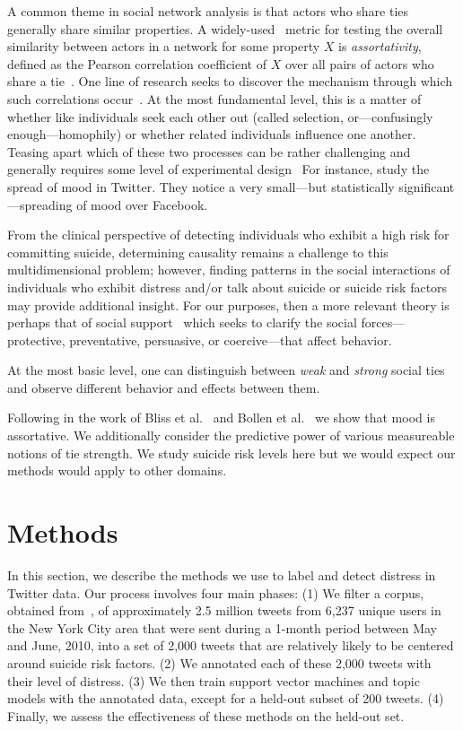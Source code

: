 \documentclass[11pt]{article}
\begin{document}
A common theme in social network analysis is that actors who share ties generally share similar properties. A widely-used~\cite{bliss2012twitter,coviello2014,bollen2011happiness} metric for testing the overall similarity between 
actors in a network for some property $X$ is \emph{assortativity}, defined as  the Pearson correlation coefficient of $X$ over all pairs of actors who share a tie~\cite{newman2002assortative}.  One line of research seeks
to discover the mechanism through which such correlations occur~\cite{newman2002assortative}. 
At the most fundamental level, this is a matter of whether like individuals seek each other out (called selection, or---confusingly enough---homophily) or whether related individuals influence one another. Teasing apart which of these two processes can be rather challenging and generally requires some level of experimental design~\cite{centola2010spread,centola2011experimental}
For instance,  study the spread of mood in Twitter. They notice a very small---but statistically significant---spreading of mood over Facebook. 

From the clinical perspective of detecting individuals who exhibit a high risk for committing suicide, determining  causality remains a challenge to this multidimensional problem; however, finding patterns in the social interactions of individuals who exhibit distress and/or talk about suicide or suicide risk factors may provide additional insight. For our purposes, then a more relevant theory is perhaps that of social support~\cite{wellman1990different} which seeks to clarify the social forces---protective, preventative, persuasive, or coercive---that affect behavior. 

At the most basic level, one can distinguish between \emph{weak} and \emph{strong} social ties and observe different behavior and effects between them.  

Following in the work of Bliss et al.~\cite{coviello2014} and Bollen et al.~\cite{bollen2011happiness} we show that 
mood is assortative. We additionally consider the predictive power of various measureable notions of tie strength.
We study suicide risk levels here but we would expect our methods would apply to other domains.



\section{Methods}
In this section, we describe the methods we use to label and detect distress in Twitter data. Our process involves four main phases: (1) We filter a corpus, obtained from~, of approximately 2.5 million tweets from 6,237 unique users in the New York City area that were sent during a 1-month period between May and June, 2010, into a set of 2,000 tweets that are relatively likely to be centered around suicide risk factors. (2) We annotated each of these 2,000 tweets with their level of distress. (3) We then train support vector machines and topic models with the annotated data, except for a held-out subset of 200 tweets. (4) Finally, we assess the effectiveness of these methods on the held-out set.
\end{document}

